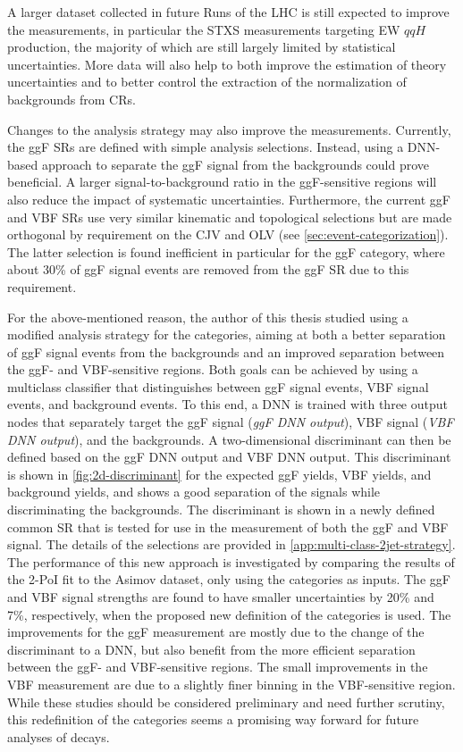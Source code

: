 A larger dataset collected in future Runs of the LHC is still expected to improve the measurements, in particular the STXS measurements targeting EW $qqH$ production, the majority of which are still largely limited by statistical uncertainties. 
More data will also help to both improve the estimation of theory uncertainties and to better control the extraction of the normalization of backgrounds from CRs. 

Changes to the analysis strategy may also improve the measurements. 
Currently, the ggF SRs are defined with simple analysis selections. Instead, using a DNN-based approach to separate the ggF signal from the backgrounds could prove beneficial. 
A larger signal-to-background ratio in the ggF-sensitive regions will also reduce the impact of systematic uncertainties. 
Furthermore, the current ggF and VBF \TwoJet SRs use very similar kinematic and topological selections but are made orthogonal by requirement on the CJV and OLV (see \cref{sec:event-categorization}). The latter selection is found inefficient in particular for the ggF \TwoJet category, where about 30\% of ggF signal events are removed from the ggF SR due to this requirement. 

For the above-mentioned reason, the author of this thesis studied using a modified analysis strategy for the \TwoJet categories, aiming at both a better separation of ggF signal events from the backgrounds and an improved separation between the ggF- and VBF-sensitive regions. 
Both goals can be achieved by using a multiclass classifier that distinguishes between ggF signal events, VBF signal events, and background events. 
To this end, a DNN is trained with three output nodes that separately target the ggF signal (\emph{ggF DNN output}), VBF signal (\emph{VBF DNN output}), and the backgrounds. 
A two-dimensional discriminant can then be defined based on the ggF DNN output and VBF DNN output.
This discriminant is shown in \cref{fig:2d-discriminant} for the expected ggF yields, VBF yields, and background yields, and shows a good separation of the signals while discriminating the backgrounds. 
The discriminant is shown in a newly defined common \TwoJet SR that is tested for use in the measurement of both the ggF and VBF signal. 
The details of the selections are provided in \cref{app:multi-class-2jet-strategy}. 
The performance of this new approach is investigated by comparing the results of the 2-PoI fit to the Asimov dataset, only using the \TwoJet categories as inputs. 
The ggF and VBF signal strengths are found to have smaller uncertainties by 20\% and 7\%, respectively, when the proposed new definition of the \TwoJet categories is used. 
The improvements for the ggF measurement are mostly due to the change of the discriminant to a DNN, but also benefit from the more efficient separation between the ggF- and VBF-sensitive regions. 
The small improvements in the VBF measurement are due to a slightly finer binning in the VBF-sensitive region. 
While these studies should be considered preliminary and need further scrutiny, this redefinition of the \TwoJet categories seems a promising way forward for future analyses of \HWW decays.

